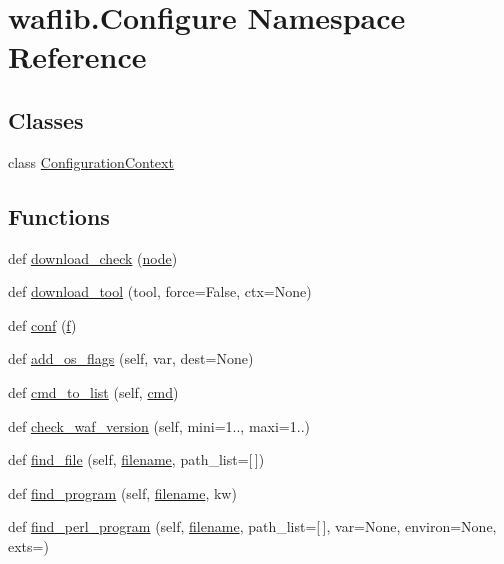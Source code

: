 \hypertarget{namespacewaflib_1_1_configure}{}\section{waflib.\+Configure Namespace Reference}
\label{namespacewaflib_1_1_configure}
\subsection*{Classes}
\begin{DoxyCompactItemize}
\item 
class \hyperlink{classwaflib_1_1_configure_1_1_configuration_context}{Configuration\+Context}
\end{DoxyCompactItemize}
\subsection*{Functions}
\begin{DoxyCompactItemize}
\item 
def \hyperlink{namespacewaflib_1_1_configure_a1e210b32a9fe3198b2a5d76f52b71217}{download\+\_\+check} (\hyperlink{structnode}{node})
\item 
def \hyperlink{namespacewaflib_1_1_configure_ad86a4a669e19d713f08512e871f3540a}{download\+\_\+tool} (tool, force=False, ctx=None)
\item 
def \hyperlink{namespacewaflib_1_1_configure_a41868904e34bb408566bcebd257f6a47}{conf} (\hyperlink{checksum_8c_ae747d72a1a803f5ff4a4b2602857d93b}{f})
\item 
def \hyperlink{namespacewaflib_1_1_configure_a8ab41e4f525735f1037b3f8af1136a04}{add\+\_\+os\+\_\+flags} (self, var, dest=None)
\item 
def \hyperlink{namespacewaflib_1_1_configure_ad63c4b95b4ee0e19c9277b62a01f4d08}{cmd\+\_\+to\+\_\+list} (self, \hyperlink{sndfile__play_8m_adfc5ba7e22f5e4a6221c12a70503bef3}{cmd})
\item 
def \hyperlink{namespacewaflib_1_1_configure_af4183e7207f75f765a04623d09d6f0f4}{check\+\_\+waf\+\_\+version} (self, mini=\textquotesingle{}1..\textquotesingle{}, maxi=\textquotesingle{}1..\textquotesingle{})
\item 
def \hyperlink{namespacewaflib_1_1_configure_a3d908ce526a31d68f9fe5868b1df9ab4}{find\+\_\+file} (self, \hyperlink{test__portburn_8cpp_a7efa5e9c7494c7d4586359300221aa5d}{filename}, path\+\_\+list=\mbox{[}$\,$\mbox{]})
\item 
def \hyperlink{namespacewaflib_1_1_configure_a3c03c8d378cab7e3288d087234c40190}{find\+\_\+program} (self, \hyperlink{test__portburn_8cpp_a7efa5e9c7494c7d4586359300221aa5d}{filename}, kw)
\item 
def \hyperlink{namespacewaflib_1_1_configure_a48a007e36c742a31bac966ce5d914814}{find\+\_\+perl\+\_\+program} (self, \hyperlink{test__portburn_8cpp_a7efa5e9c7494c7d4586359300221aa5d}{filename}, path\+\_\+list=\mbox{[}$\,$\mbox{]}, var=None, environ=None, exts=\textquotesingle{}\textquotesingle{})
\end{DoxyCompactItemize}
